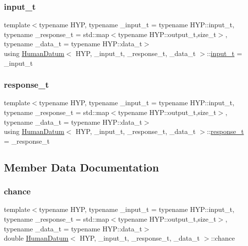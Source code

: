 \subsubsection{\texorpdfstring{input\+\_\+t}{input\_t}}
{\footnotesize\ttfamily template$<$typename H\+YP, typename \+\_\+input\+\_\+t = typename H\+Y\+P\+::input\+\_\+t, typename \+\_\+response\+\_\+t = std\+::map$<$typename H\+Y\+P\+::output\+\_\+t,size\+\_\+t$>$, typename \+\_\+data\+\_\+t = typename H\+Y\+P\+::data\+\_\+t$>$ \\
using \hyperlink{struct_human_datum}{Human\+Datum}$<$ H\+YP, \+\_\+input\+\_\+t, \+\_\+response\+\_\+t, \+\_\+data\+\_\+t $>$\+::\hyperlink{struct_human_datum_a8229662f54f4b18d33b0d068d23b03b0}{input\+\_\+t} =  \+\_\+input\+\_\+t}

\mbox{\label{struct_human_datum_a372a0b9a919bc58aae2fa4de57dd9221}} 
\subsubsection{\texorpdfstring{response\+\_\+t}{response\_t}}
{\footnotesize\ttfamily template$<$typename H\+YP, typename \+\_\+input\+\_\+t = typename H\+Y\+P\+::input\+\_\+t, typename \+\_\+response\+\_\+t = std\+::map$<$typename H\+Y\+P\+::output\+\_\+t,size\+\_\+t$>$, typename \+\_\+data\+\_\+t = typename H\+Y\+P\+::data\+\_\+t$>$ \\
using \hyperlink{struct_human_datum}{Human\+Datum}$<$ H\+YP, \+\_\+input\+\_\+t, \+\_\+response\+\_\+t, \+\_\+data\+\_\+t $>$\+::\hyperlink{struct_human_datum_a372a0b9a919bc58aae2fa4de57dd9221}{response\+\_\+t} =  \+\_\+response\+\_\+t}



\subsection{Member Data Documentation}
\mbox{\label{struct_human_datum_aca8d9329fdb039825106735fff8b653d}} 
\subsubsection{\texorpdfstring{chance}{chance}}
{\footnotesize\ttfamily template$<$typename H\+YP, typename \+\_\+input\+\_\+t = typename H\+Y\+P\+::input\+\_\+t, typename \+\_\+response\+\_\+t = std\+::map$<$typename H\+Y\+P\+::output\+\_\+t,size\+\_\+t$>$, typename \+\_\+data\+\_\+t = typename H\+Y\+P\+::data\+\_\+t$>$ \\
double \hyperlink{struct_human_datum}{Human\+Datum}$<$ H\+YP, \+\_\+input\+\_\+t, \+\_\+response\+\_\+t, \+\_\+data\+\_\+t $>$\+::chance}

